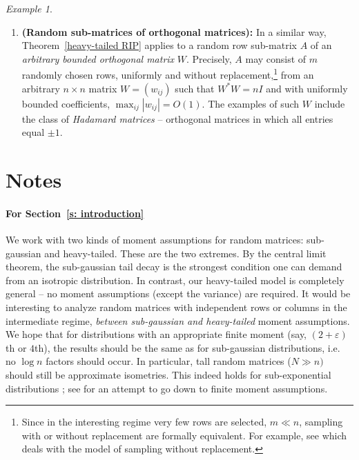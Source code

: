 \documentclass[10pt, openany]{book}
\theoremstyle{remark}
\newtheorem{example}[theorem]{Example}
\def \e {\varepsilon}
\begin{document}
\begin{example}
\begin{enumerate}
  \item {\bf (Random sub-matrices of orthogonal matrices):} 
    In a similar way, Theorem~\ref{heavy-tailed RIP} applies to a random row sub-matrix $A$ 
    of an {\em arbitrary bounded orthogonal matrix} $W$. Precisely, $A$ may consist of  
    $m$ randomly chosen rows, uniformly 
    and without replacement,\footnote{Since in the interesting regime 
    very few rows are selected, $m \ll n$, sampling with or without replacement are formally equivalent. 
    For example, see \cite{RV Fourier} which deals with the model of sampling without replacement.}
    from an arbitrary $n \times n$ matrix $W = (w_{ij})$ such that $W^*W = n I$ 
    and with uniformly bounded coefficients, $\max_{ij} |w_{ij}| = O(1)$.
    The examples of such $W$ include the class of {\em Hadamard matrices} 
    -- orthogonal matrices in which all entries equal $\pm 1$. 
\end{enumerate}
\end{example}





\section{Notes}					\label{s: notes}

\paragraph{For Section~\ref{s: introduction}}

We work with two kinds of moment assumptions for random matrices: sub-gaussian and heavy-tailed. 
These are the two extremes. By the central limit theorem, the sub-gaussian tail decay 
is the strongest condition one can demand from an isotropic distribution. In contrast, our heavy-tailed model
is completely general -- no moment assumptions (except the variance) are required.
It would be interesting to analyze random matrices with independent rows or columns in the 
intermediate regime, {\em between sub-gaussian and heavy-tailed} moment assumptions.
We hope that for distributions with an appropriate finite moment (say, $(2+\e)$th or $4$th), 
the results should be the same as for sub-gaussian distributions, i.e. no $\log n$ factors should occur. 
In particular, tall random matrices ($N \gg n)$ should still be approximate isometries. 
This indeed holds for sub-exponential distributions \cite{ALPT}; 
see \cite{V covariance} for an attempt to go down to finite moment assumptions. 
\end{document}
